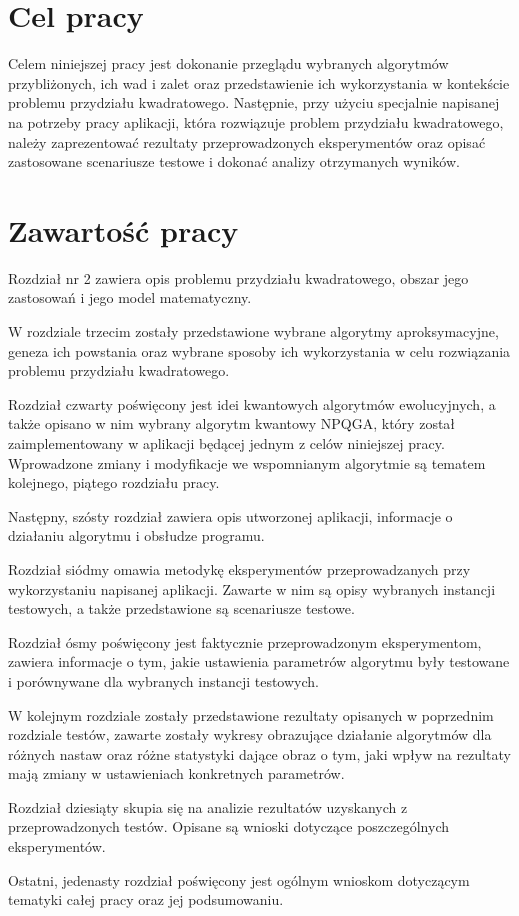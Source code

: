 \section{Cel pracy}
\label{sec:cel}
Celem niniejszej pracy jest dokonanie przeglądu wybranych algorytmów przybliżonych, ich wad i zalet oraz przedstawienie ich wykorzystania w kontekście problemu przydziału kwadratowego. Następnie, przy użyciu specjalnie napisanej na potrzeby pracy aplikacji, która rozwiązuje problem przydziału kwadratowego, należy zaprezentować rezultaty przeprowadzonych eksperymentów oraz opisać zastosowane scenariusze testowe i dokonać analizy otrzymanych wyników.

\section{Zawartość pracy}
\label{sec:zawartosc}
Rozdział nr 2 zawiera opis problemu przydziału kwadratowego, obszar jego zastosowań i jego model matematyczny.

W rozdziale trzecim zostały przedstawione wybrane algorytmy aproksymacyjne, geneza ich powstania oraz wybrane sposoby ich wykorzystania w celu rozwiązania problemu przydziału kwadratowego.

Rozdział czwarty poświęcony jest idei kwantowych algorytmów ewolucyjnych, a także opisano w nim wybrany algorytm kwantowy NPQGA, który został zaimplementowany w aplikacji będącej jednym z celów niniejszej pracy. Wprowadzone zmiany i modyfikacje we wspomnianym algorytmie są tematem kolejnego, piątego rozdziału pracy.

Następny, szósty rozdział zawiera opis utworzonej aplikacji, informacje o działaniu algorytmu i obsłudze programu.

Rozdział siódmy omawia metodykę eksperymentów przeprowadzanych przy wykorzystaniu napisanej aplikacji. Zawarte w nim są opisy wybranych instancji testowych, a także przedstawione są scenariusze testowe.

Rozdział ósmy  poświęcony jest faktycznie przeprowadzonym eksperymentom, zawiera informacje o tym, jakie ustawienia parametrów algorytmu były testowane i porównywane dla wybranych instancji testowych.

W kolejnym rozdziale zostały przedstawione rezultaty opisanych w poprzednim rozdziale testów, zawarte zostały wykresy obrazujące działanie algorytmów dla różnych nastaw oraz różne statystyki dające obraz o tym, jaki wpływ na rezultaty mają zmiany w ustawieniach konkretnych parametrów.

Rozdział dziesiąty skupia się na analizie rezultatów uzyskanych z przeprowadzonych testów. Opisane są wnioski dotyczące poszczególnych eksperymentów.

Ostatni, jedenasty rozdział poświęcony jest ogólnym wnioskom dotyczącym tematyki całej pracy oraz jej podsumowaniu.